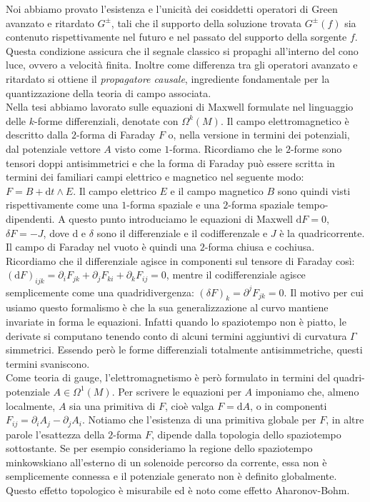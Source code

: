 \documentclass[11pt,a4paper]{article}
\begin{document}
	Noi abbiamo provato l'esistenza e l'unicità dei cosiddetti operatori di Green avanzato e ritardato $G^\pm$, tali che il supporto della soluzione trovata $G^\pm(f)$ sia contenuto rispettivamente nel futuro e nel passato del supporto della sorgente $f$. Questa condizione assicura che il segnale classico si propaghi all'interno del cono luce, ovvero a velocità finita. Inoltre come differenza tra gli operatori avanzato e ritardato si ottiene il \emph{propagatore causale}, ingrediente fondamentale per la quantizzazione della teoria di campo associata.\\
	
	Nella tesi abbiamo lavorato sulle equazioni di Maxwell formulate nel linguaggio delle $k$-forme differenziali, denotate con $\Omega^k(M)$. Il campo elettromagnetico è descritto dalla $2$-forma di Faraday $F$ o, nella versione in termini dei potenziali, dal potenziale vettore $A$ visto come $1$-forma. Ricordiamo che le $2$-forme sono tensori doppi antisimmetrici e che la forma di Faraday può essere scritta in termini dei familiari campi elettrico e magnetico nel seguente modo: $F=B+\mathrm{d}t\wedge E$. Il campo elettrico $E$ e il campo magnetico $B$ sono quindi visti rispettivamente come una $1$-forma spaziale e una $2$-forma spaziale tempo-dipendenti. A questo punto introduciamo le equazioni di Maxwell $\mathrm{d}F=0$, $\delta F=-J$, dove $\mathrm{d}$ e $\delta$ sono il differenziale e il codifferenzale e $J$ è la quadricorrente. Il campo di Faraday nel vuoto è quindi una $2$-forma chiusa e cochiusa. Ricordiamo che il differenziale agisce in componenti sul tensore di Faraday così: $(\mathrm{d}F)_{ijk}=\partial_i F_{jk}+\partial_j F_{ki}+\partial_k F_{ij}=0$, mentre il codifferenziale agisce semplicemente come una quadridivergenza: $(\delta F)_k=\partial^jF_{jk}=0$. Il motivo per cui usiamo questo formalismo è che la sua generalizzazione al curvo mantiene invariate in forma le equazioni. Infatti quando lo spaziotempo non è piatto, le derivate si computano tenendo conto di alcuni termini aggiuntivi di curvatura $\Gamma$ simmetrici. Essendo però le forme differenziali totalmente antisimmetriche, questi termini svaniscono.\\
	
	Come teoria di gauge, l'elettromagnetismo è però formulato in termini del quadri-potenziale $A\in\Omega^1(M)$. Per scrivere le equazioni per $A$ imponiamo che, almeno localmente, $A$ sia una primitiva di $F$, cioè valga $F=\mathrm{d}A$, o in componenti $F_{ij}=\partial_iA_j-\partial_jA_i$. Notiamo che l'esistenza di una primitiva globale per $F$, in altre parole l'esattezza della $2$-forma $F$, dipende dalla topologia dello spaziotempo sottostante. Se per esempio consideriamo la regione dello spaziotempo minkowskiano all'esterno di un solenoide percorso da corrente, essa non è semplicemente connessa e il potenziale generato non è definito globalmente. Questo effetto topologico è misurabile ed è noto come effetto Aharonov-Bohm.\\
	
\end{document}
